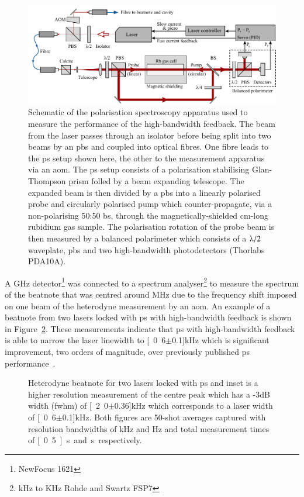 \begin{figure}
\center
\includegraphics[width=\linewidth]{part1/Figs/ps_two_laser.pdf}
\caption{Schematic of the polarisation spectroscopy apparatus used to measure the performance of the high-bandwidth feedback. The beam from the laser passes through an isolator before being split into two beams by an \gls{pbs} and coupled into optical fibres.
One fibre leads to the \gls{ps} setup shown here, the other to the measurement apparatus via an \gls{aom}.
The \gls{ps} setup consists of a polarisation stabilising Glan-Thompson prism folled by a beam expanding telescope.
The expanded beam is then divided by a \gls{pbs} into a linearly polarised probe and circularly polarised pump which counter-propagate, via a non-polarising 50:50 \gls{bs}, through the magnetically-shielded \unit[15]{cm}-long rubidium gas sample.
The polarisation rotation of the probe beam is then measured by a balanced polarimeter which consists of a $\lambdaup/2$ waveplate, \gls{pbs} and two high-bandwidth photodetectors (Thorlabs PDA10A).}
\label{figure:two_laser_setup}
\end{figure}

A \unit[1]{GHz} detector\footnote{NewFocus 1621} was connected to a spectrum analyser\footnote{\unit[9]{kHz} to \unit[7]{KHz} Rohde and Swartz FSP7} to measure the spectrum of the beatnote that was centred around \unit[80]{MHz} due to the frequency shift imposed on one beam of the heterodyne measurement by an \gls{aom}.
An example of a beatnote from two lasers locked with \gls{ps} with high-bandwidth feedback is shown in Figure~\ref{figure:two_laser_beatnote}.
These measurements indicate that \gls{ps} with high-bandwidth feedback is able to narrow the laser linewidth to \unit[0.6$\pm$0.1]{kHz} which is significant improvement, two orders of magnitude, over previously published \gls{ps} performance~\cite{torii_laser-phase_2012}.

\begin{figure}
\center

\caption{Heterodyne beatnote for two lasers locked with \gls{ps} and inset is a higher resolution measurement of the centre peak which has a -3dB width (\gls{fwhm}) of \unit[2.0$\pm$0.36]{kHz} which corresponds to a laser width of \unit[0.6$\pm$0.1]{kHz}.
Both figures are 50-shot averages captured with resolution bandwidths of \unit[30]{kHz} and \unit[100]{Hz} and total measurement times of \unit[0.5]{s} and \unit[2]{s} respectively.}
\label{figure:two_laser_beatnote}
\end{figure}

